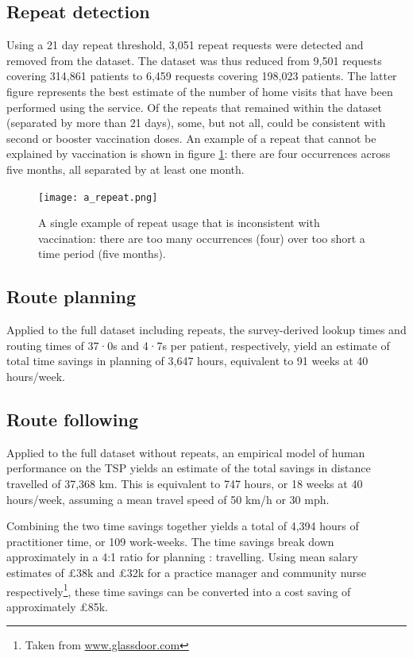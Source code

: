 \documentclass[review]{elsarticle}
\begin{document}
\subsection{Repeat detection}

Using a 21 day repeat threshold, 3,051 repeat requests were detected and removed from the dataset. The dataset was thus reduced from 9,501 requests covering 314,861 patients to 6,459 requests covering 198,023 patients. The latter figure represents the best estimate of the number of home visits that have been performed using the service. Of the repeats that remained within the dataset (separated by more than 21 days), some, but not all, could be consistent with second or booster vaccination doses. An example of a repeat that cannot be explained by vaccination is shown in figure \ref{a_repeat}: there are four occurrences across five months, all separated by at least one month. 

\begin{figure}[H]
\centering
\texttt{[image: a\_repeat.png]}
\caption{A single example of repeat usage that is inconsistent with vaccination: there are too many occurrences (four) over too short a time period (five months).}
\label{a_repeat}
\end{figure}


\subsection{Route planning}

Applied to the full dataset including repeats, the survey-derived lookup times and routing times of 37·0s and 4·7s per patient, respectively, yield an estimate of total time savings in planning of 3,647 hours, equivalent to 91 weeks at 40 hours/week. 


\subsection{Route following}

Applied to the full dataset without repeats, an empirical model of human performance on the TSP yields an estimate of the total savings in distance travelled of 37,368 km. This is equivalent to 747 hours, or 18 weeks at 40 hours/week, assuming a mean travel speed of 50 km/h or 30 mph. 

Combining the two time savings together yields a total of 4,394 hours of practitioner time, or 109 work-weeks. The time savings break down approximately in a 4:1 ratio for planning : travelling. Using mean salary estimates of £38k and £32k for a practice manager and community nurse respectively\footnote{Taken from \hyperlink{www.glassdoor.com}{www.glassdoor.com}}, these time savings can be converted into a cost saving of approximately £85k. 
\end{document}
